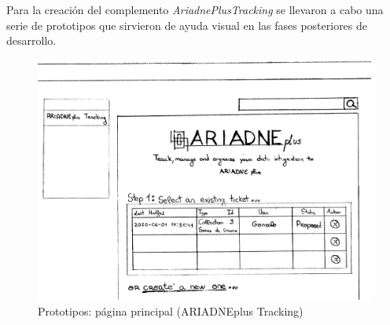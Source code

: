 \documentclass[
]{article}
\begin{document}
Para la creación del complemento \emph{AriadnePlusTracking} se llevaron
a cabo una serie de prototipos que sirvieron de ayuda visual en las
fases posteriores de desarrollo.

\begin{figure}
\hypertarget{index-prototipe}{%
\centering
\includegraphics{../_static/images/index-prototipe.png}
\caption{Prototipos: página principal (ARIADNEplus
Tracking)}\label{index-prototipe}
}
\end{figure}
\end{document}
